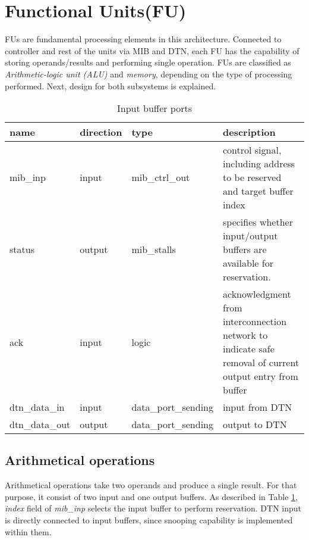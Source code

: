 \section{Functional Units(FU)}
	FUs are fundamental processing elements in this architecture. Connected to controller and rest of the units via MIB and DTN, each FU has the capability of storing operands/results and performing single operation. FUs are classified as \textit{Arithmetic-logic unit (ALU)} and \textit{memory}, depending on the type of processing performed. Next, design for both subsystems is explained.
	
	\begin{table}
		\begin{tabular}{| l| l | l | p{8cm} |}
			\hline
			\textbf{name} & \textbf{direction} & \textbf{type} &  \textbf{description}\\ \hline
			mib\_inp & input & mib\_ctrl\_out & control signal, including address to be reserved and target buffer index \\ \hline
			status & output & mib\_stalls & specifies whether input/output buffers are available for reservation. \\ \hline
			ack & input & logic & acknowledgment from interconnection network to indicate safe removal of current output entry from buffer \\ \hline
			dtn\_data\_in & input & data\_port\_sending & input from DTN \\ \hline
			dtn\_data\_out & output & data\_port\_sending & output to DTN \\ \hline
		\end{tabular}
		
		\caption{Input buffer ports \label{table:fu_alu_description}}
		\centering
	\end{table}
	\subsection{Arithmetical operations}
	Arithmetical operations take two operands and produce a single result. For that purpose, it consist of two input and one output buffers. As described in Table \ref{table:fu_alu_description}, \textit{index} field of \textit{mib\_inp} selects the input buffer to perform reservation. DTN input is directly connected to input buffers, since snooping capability is implemented within them.
	
